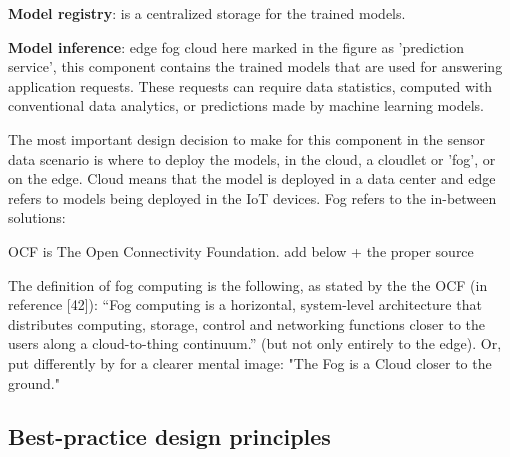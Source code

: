 \textbf{Model registry}: is a centralized storage for the trained models. 


\textbf{Model inference}: edge fog cloud here marked in the figure as 'prediction service', this component contains the trained models that are used for answering application requests. These requests can require data statistics, computed with conventional data analytics, or predictions made by machine learning models.

The most important design decision to make for this component in the sensor data scenario is where to deploy the models, in the cloud, a cloudlet or 'fog', or on the edge. Cloud means that the model is deployed in a data center and edge refers to models being deployed in the IoT devices. Fog refers to the in-between solutions: 

OCF is The Open Connectivity Foundation. add below + the proper source

The definition of fog computing is the following, as stated by the the OCF (in \cite{fogsurvey} reference [42]): “Fog computing is a horizontal, system-level architecture that distributes computing, storage, control and networking functions closer to the users along a cloud-to-thing continuum.” (but not only entirely to the edge). Or, put differently by \cite{fogsurvey} for a clearer mental image: "The Fog is a Cloud closer to the ground."
\subsection{Best-practice design principles}







